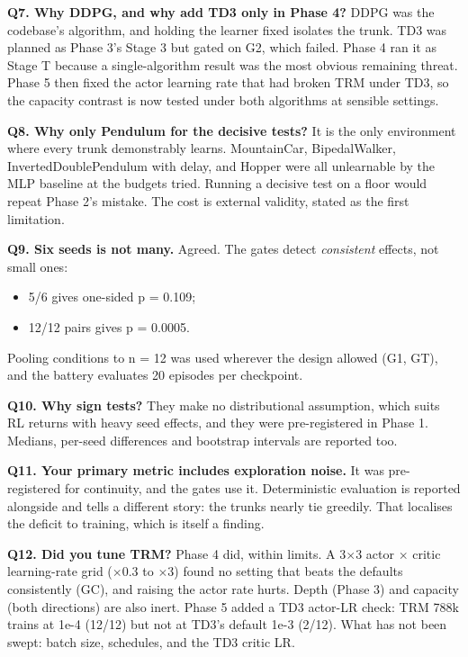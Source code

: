 \documentclass[11pt]{article}
\begin{document}
\textbf{Q7. Why DDPG, and why add TD3 only in Phase 4?} DDPG was the codebase's algorithm, and holding the learner fixed isolates the trunk. TD3 was planned as Phase 3's Stage 3 but gated on G2, which failed. Phase 4 ran it as Stage T because a single-algorithm result was the most obvious remaining threat. Phase 5 then fixed the actor learning rate that had broken TRM under TD3, so the capacity contrast is now tested under both algorithms at sensible settings.



\textbf{Q8. Why only Pendulum for the decisive tests?} It is the only environment where every trunk demonstrably learns. MountainCar, BipedalWalker, InvertedDoublePendulum with delay, and Hopper were all unlearnable by the MLP baseline at the budgets tried. Running a decisive test on a floor would repeat Phase 2's mistake. The cost is external validity, stated as the first limitation.



\textbf{Q9. Six seeds is not many.} Agreed. The gates detect \emph{consistent} effects, not small ones:

\begin{itemize}
\item 5/6 gives one-sided p = 0.109;
\item 12/12 pairs gives p = 0.0005.
\end{itemize}



Pooling conditions to n = 12 was used wherever the design allowed (G1, GT), and the battery evaluates 20 episodes per checkpoint.



\textbf{Q10. Why sign tests?} They make no distributional assumption, which suits RL returns with heavy seed effects, and they were pre-registered in Phase 1. Medians, per-seed differences and bootstrap intervals are reported too.



\textbf{Q11. Your primary metric includes exploration noise.} It was pre-registered for continuity, and the gates use it. Deterministic evaluation is reported alongside and tells a different story: the trunks nearly tie greedily. That localises the deficit to training, which is itself a finding.



\textbf{Q12. Did you tune TRM?} Phase 4 did, within limits. A 3$\times$3 actor $\times$ critic learning-rate grid ($\times$0.3 to $\times$3) found no setting that beats the defaults consistently (GC), and raising the actor rate hurts. Depth (Phase 3) and capacity (both directions) are also inert. Phase 5 added a TD3 actor-LR check: TRM 788k trains at 1e-4 (12/12) but not at TD3's default 1e-3 (2/12). What has not been swept: batch size, schedules, and the TD3 critic LR.
\end{document}
